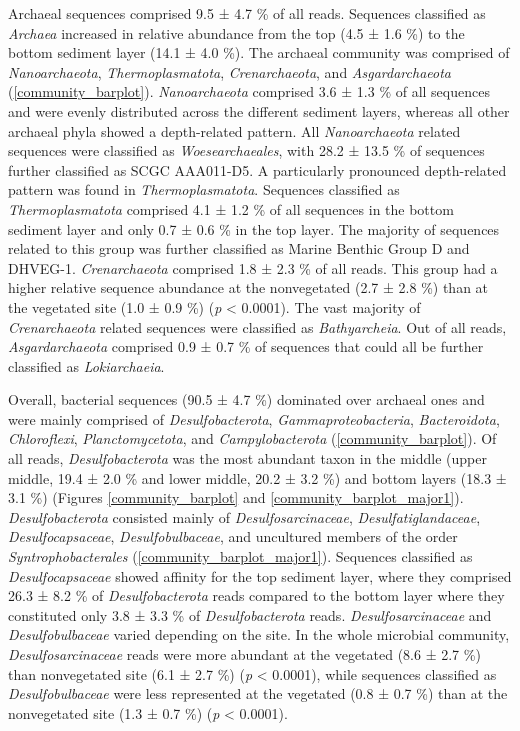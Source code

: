 \documentclass[12pt,]{article}
\begin{document}
Archaeal sequences comprised 9.5 ± 4.7 \si{\percent} of all reads.
Sequences classified as \emph{Archaea} increased in relative abundance
from the top (4.5 ± 1.6 \si{\percent}) to the bottom sediment layer
(14.1 ± 4.0 \si{\percent}). The archaeal community was comprised of
\emph{Nanoarchaeota}, \emph{Thermoplasmatota}, \emph{Crenarchaeota}, and
\emph{Asgardarchaeota} (\autoref{community_barplot}).
\emph{Nanoarchaeota} comprised 3.6 ± 1.3 \si{\percent} of all sequences
and were evenly distributed across the different sediment layers,
whereas all other archaeal phyla showed a depth-related pattern. All
\emph{Nanoarchaeota} related sequences were classified as
\emph{Woesearchaeales}, with 28.2 ± 13.5 \si{\percent} of sequences
further classified as SCGC AAA011-D5. A particularly pronounced
depth-related pattern was found in \emph{Thermoplasmatota}. Sequences
classified as \emph{Thermoplasmatota} comprised 4.1 ± 1.2 \si{\percent}
of all sequences in the bottom sediment layer and only 0.7 ± 0.6
\si{\percent} in the top layer. The majority of sequences related to
this group was further classified as Marine Benthic Group D and DHVEG-1.
\emph{Crenarchaeota} comprised 1.8 ± 2.3 \si{\percent} of all reads.
This group had a higher relative sequence abundance at the nonvegetated
(2.7 ± 2.8 \si{\percent}) than at the vegetated site (1.0 ± 0.9
\si{\percent}) (\emph{p} \textless{} 0.0001). The vast majority of
\emph{Crenarchaeota} related sequences were classified as
\emph{Bathyarcheia}. Out of all reads, \emph{Asgardarchaeota} comprised
0.9 ± 0.7 \si{\percent} of sequences that could all be further
classified as \emph{Lokiarchaeia}.

Overall, bacterial sequences (90.5 ± 4.7 \si{\percent}) dominated over
archaeal ones and were mainly comprised of \emph{Desulfobacterota},
\emph{Gammaproteobacteria}, \emph{Bacteroidota}, \emph{Chloroflexi},
\emph{Planctomycetota}, and \emph{Campylobacterota}
(\autoref{community_barplot}). Of all reads, \emph{Desulfobacterota} was
the most abundant taxon in the middle (upper middle, 19.4 ± 2.0
\si{\percent} and lower middle, 20.2 ± 3.2 \si{\percent}) and bottom
layers (18.3 ± 3.1 \si{\percent}) (Figures \ref{community_barplot} and
\ref{community_barplot_major1}). \emph{Desulfobacterota} consisted
mainly of \emph{Desulfosarcinaceae}, \emph{Desulfatiglandaceae},
\emph{Desulfocapsaceae}, \emph{Desulfobulbaceae}, and uncultured members
of the order \emph{Syntrophobacterales}
(\autoref{community_barplot_major1}). Sequences classified as
\emph{Desulfocapsaceae} showed affinity for the top sediment layer,
where they comprised 26.3 ± 8.2 \si{\percent} of \emph{Desulfobacterota}
reads compared to the bottom layer where they constituted only 3.8 ± 3.3
\si{\percent} of \emph{Desulfobacterota} reads.
\emph{Desulfosarcinaceae} and \emph{Desulfobulbaceae} varied depending
on the site. In the whole microbial community, \emph{Desulfosarcinaceae}
reads were more abundant at the vegetated (8.6 ± 2.7 \si{\percent}) than
nonvegetated site (6.1 ± 2.7 \si{\percent}) (\emph{p} \textless{}
0.0001), while sequences classified as \emph{Desulfobulbaceae} were less
represented at the vegetated (0.8 ± 0.7 \si{\percent}) than at the
nonvegetated site (1.3 ± 0.7 \si{\percent}) (\emph{p} \textless{}
0.0001).
\end{document}
